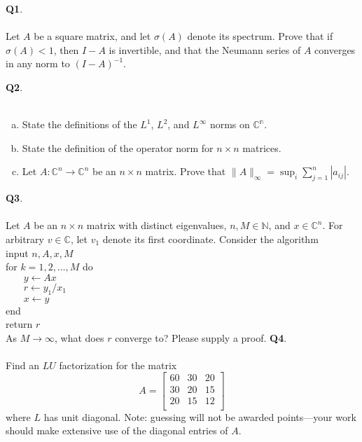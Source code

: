 \documentclass[12pt, oneside]{amsart}
\begin{document}
\vfill


\newpage
\noindent
\textbf{Q1}. \\ \\ 
Let $A$ be a square matrix, and let $\sigma(A)$ denote its spectrum. Prove that
if $\sigma(A) < 1$, then $I-A$ is invertible, and that the Neumann series of $A$ converges in any norm to $(I - A)^{-1}$. \\
\newpage

\noindent
\textbf{Q2}.\\ \\ 
\begin{enumerate}[a)]
\item State the definitions of the $L^1$, $L^2$, and $L^\infty$ norms on $\mathbb{C^n}$.
\vspace{2in}
\item State the definition of the operator norm for $n \times n$ matrices.
\vspace{2in}
\item Let $A : \mathbb{C}^n \to \mathbb{C}^n$ be an $n \times n$ matrix. Prove that
$ \| A \|_{\infty} = \sup_i \sum_{j = 1}^n | a_{ij} | $.
\end{enumerate}

\newpage
\noindent
\textbf{Q3}. \\ \\ 
Let $A$ be an $n \times n$ matrix with distinct eigenvalues, $n, M \in
\mathbb{N}$, and $x \in \mathbb{C}^n$. For arbitrary $v \in \mathbb{C}$, let
$v_1$ denote its first coordinate. Consider the algorithm 
\vspace{0.1in}\\
\noindent
input $n,A,x,M$ \\
for $k=1,2,\ldots,M$ do \\
$\phantom{bobo}y \leftarrow Ax$ \\
$\phantom{bobo}r \leftarrow y_1/x_1$ \\
$\phantom{bobo} x \leftarrow y$ \\
end \\
return $r$ 
\vspace{0.3in} \\
\noindent
As $M \to \infty$, what does $r$ converge to? Please supply a proof. 
\newpage
\noindent
\textbf{Q4}. \\ \\ 
\noindent
Find an $LU$ factorization for the matrix
\begin{equation*}
A = \begin{bmatrix}
60 & 30 & 20 \\
30 & 20 & 15 \\
20 & 15 & 12 \\
\end{bmatrix}
\end{equation*}
where $L$ has unit diagonal. Note: guessing will not be awarded points---your work should make extensive use of the diagonal entries of $A$. 
\end{document}
